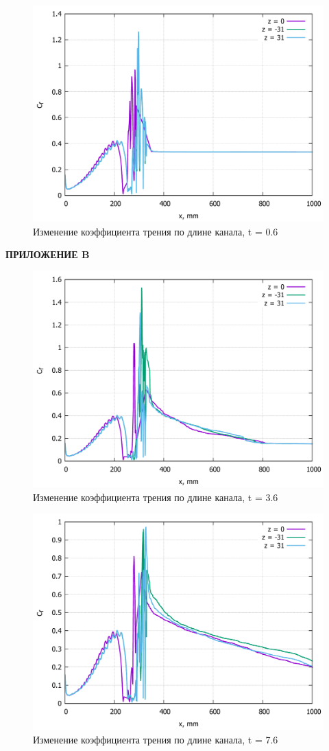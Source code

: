 \begin{figure}[H]
	\centering
	\includegraphics[width=0.8\linewidth]{../Assets/Cf-T06-all}
	\caption{Изменение коэффициента трения по длине канала, t = 0.6}
	\label{fig:cf-t06-all}
\end{figure}
\newpage
\begin{flushright}
	\MakeUppercase{\textbf{Приложение B}}
\end{flushright}
\begin{figure}[H]
	\centering
	\includegraphics[width=0.8\linewidth]{../Assets/Cf-T360-all}
	\caption{Изменение коэффициента трения по длине канала, t = 3.6}
	\label{fig:cf-t360-all}
\end{figure}
\begin{figure}[H]
	\centering
	\includegraphics[width=0.8\linewidth]{../Assets/Cf-T760-all}
	\caption{Изменение коэффициента трения по длине канала, t = 7.6}
	\label{fig:cf-t760-all}
\end{figure}
